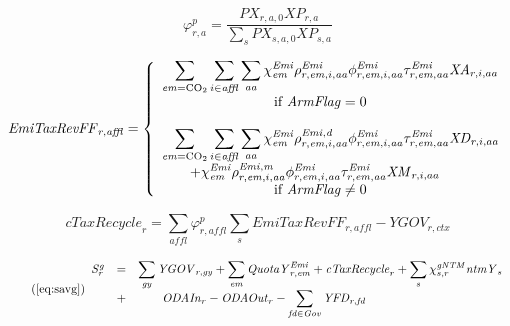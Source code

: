 \documentclass[11pt,letterpaper]{report}
\begin{document}
\begin{equation}
\label{eq:xpshr}
\varphi^p_{r,a} = \frac{\mathit{PX}_{r,a,0} \mathit{XP}_{r,a}}
{\displaystyle \sum_s{\mathit{PX}_{s,a,0} \mathit{XP}_{s,a}}}
\end{equation}

\begin{equation}
\label{eq:emitaxrefff}
\mathit{EmiTaxRevFF}_{r,\mathit{affl}} =
\left\{
   \begin{array}{*{20}{l}}
      \displaystyle \sum_{\mathit{em}=\textmd{CO}_2} { \sum_{i \in {\mathit{affl}}} {\sum_{\mathit{aa}} {
         \chi^{\mathit{Emi}}_{\mathit{em}}
         \rho^{\mathit{Emi}}_{r,\mathit{em},i,\mathit{aa}}
         \phi^{\mathit{Emi}}_{r,\mathit{em},i,\mathit{aa}}
            \tau^{\mathit{Emi}}_{r,\mathit{em},\mathit{aa}} \mathit{XA}_{r,i,aa}
      }}}
      \\ \qquad \qquad \qquad \qquad \textrm{if } \mathit{ArmFlag} = 0 \\ \\
      \displaystyle \sum_{\mathit{em}=\textmd{CO}_2} { \sum_{i \in {\mathit{affl}}} {\sum_{\mathit{aa}} {
         \chi^{\mathit{Emi}}_{\mathit{em}}
         \rho^{\mathit{Emi,d}}_{r,\mathit{em},i,\mathit{aa}}
         \phi^{\mathit{Emi}}_{r,\mathit{em},i,\mathit{aa}}
         \tau^{\mathit{Emi}}_{r,\mathit{em},\mathit{aa}}
            \mathit{XD}_{r,i,aa} }}} \\
      \qquad \displaystyle
      +  {\chi^{\mathit{Emi}}_{\mathit{em}}
            \rho^{\mathit{Emi,m}}_{r,\mathit{em},i,\mathit{aa}}
            \phi^{\mathit{Emi}}_{r,\mathit{em},i,\mathit{aa}}
            \tau^{\mathit{Emi}}_{r,\mathit{em},\mathit{aa}}\mathit{XM}_{r,i,aa}
         }
      \\ \qquad \qquad \qquad \qquad \textrm{if } \mathit{ArmFlag} \ne 0 \\
\end{array}
\right.
\end{equation}

\begin{equation}
\label{eq:ctaxRecycle}
\mathit{cTaxRecycle}_r = \sum_{\mathit{affl}} {\varphi^p_{r,\mathit{affl}}\sum_s{\mathit{EmiTaxRevFF}_{r,\mathit{affl}}}}
- \mathit{YGOV}_{r,ctx}
\end{equation}

\begin{equation}
\label{eq:savgp}
\tag{\ref{eq:savg}}
\begin{array}{l l l}
\mathit{S^g_r} & = & \displaystyle
   \sum_{\mathit{gy}} {\mathit{YGOV}_{r,\mathit{gy}}} +
   \sum_{\mathit{em}} {\mathit{QuotaY}^{\mathit{Emi}}_{r,\mathit{em}}} +
   \mathit{cTaxRecycle}_r +
   \sum_s{\chi^{\mathit{gNTM}}_{s,r} \mathit{ntmY}_s} \\
{} & + & \qquad \displaystyle \mathit{ODAIn}_r - \mathit{ODAOut}_r
   -   \sum_{\mathit{fd} \in {\mathit{Gov}}}{\mathit{YFD}_{r,\mathit{fd}}}
\end{array}
\end{equation}
\end{document}
